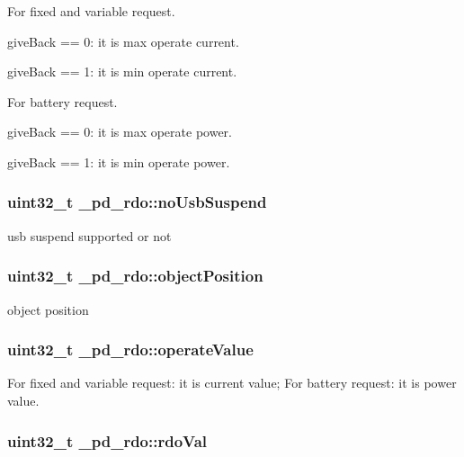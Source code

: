 \begin{DoxyItemize}
\item For fixed and variable request.
\begin{DoxyItemize}
\item give\-Back == 0\-: it is max operate current.
\item give\-Back == 1\-: it is min operate current.
\end{DoxyItemize}
\item For battery request.
\begin{DoxyItemize}
\item give\-Back == 0\-: it is max operate power.
\item give\-Back == 1\-: it is min operate power. 
\end{DoxyItemize}
\end{DoxyItemize}\hypertarget{struct__pd__rdo_a85b57e63d9528131d0092a43111b2a98}{
\subsubsection[{no\-Usb\-Suspend}]{\setlength{\rightskip}{0pt plus 5cm}uint32\-\_\-t \-\_\-pd\-\_\-rdo\-::no\-Usb\-Suspend}}\label{struct__pd__rdo_a85b57e63d9528131d0092a43111b2a98}
usb suspend supported or not \hypertarget{struct__pd__rdo_a593d7f2473f5f2ccd44e7a1a71bd6df5}{
\subsubsection[{object\-Position}]{\setlength{\rightskip}{0pt plus 5cm}uint32\-\_\-t \-\_\-pd\-\_\-rdo\-::object\-Position}}\label{struct__pd__rdo_a593d7f2473f5f2ccd44e7a1a71bd6df5}
object position \hypertarget{struct__pd__rdo_ace7bc599e359ab9c6e626b0b0cdb5359}{
\subsubsection[{operate\-Value}]{\setlength{\rightskip}{0pt plus 5cm}uint32\-\_\-t \-\_\-pd\-\_\-rdo\-::operate\-Value}}\label{struct__pd__rdo_ace7bc599e359ab9c6e626b0b0cdb5359}
For fixed and variable request\-: it is current value; For battery request\-: it is power value. \hypertarget{struct__pd__rdo_a66cd4e249b3284e7d1acc9714fa0ce0a}{
\subsubsection[{rdo\-Val}]{\setlength{\rightskip}{0pt plus 5cm}uint32\-\_\-t \-\_\-pd\-\_\-rdo\-::rdo\-Val}}\label{struct__pd__rdo_a66cd4e249b3284e7d1acc9714fa0ce0a}
